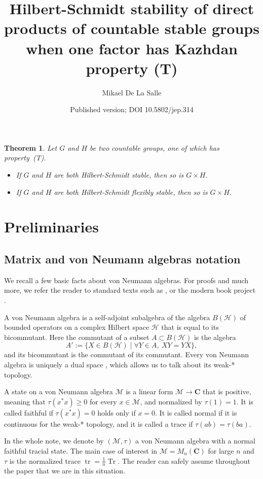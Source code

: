\documentclass[10pt]{amsart}
\title[HS stability of direct products]{Hilbert-Schmidt stability of direct products of countable stable groups when one factor has Kazhdan property (T)}
\author{Mikael De La Salle}
\date{Published version; DOI 10.5802/jep.314}
\theoremstyle{plain}
\newtheorem{theorem}{Theorem}[section]
\theoremstyle{definition}
\newcommand{\C}{\mathbf{C}}
\newcommand{\cM}{\mathcal{M}}
\newcommand{\cH}{\mathcal{H}}
\DeclareMathOperator{\tr}{tr}
\DeclareMathOperator{\Tr}{Tr}
\numberwithin{equation}{section}
\begin{document}
\maketitle
\setcounter{section}{0}\setcounter{theorem}{0}
\begin{theorem}\label{thm:stability_direct_product_simple} Let $G$ and $H$ be two countable groups, one of which has property~(T).\enlargethispage{.5\baselineskip}

\begin{itemize}
\item
If $G$ and $H$ are both Hilbert-Schmidt stable, then so is $G\times H$.

\item
If $G$ and $H$ are both Hilbert-Schmidt flexibly stable, then so is $G\times H$.
\end{itemize}
\end{theorem}
\setcounter{section}{0}
\section{Preliminaries}\label{sec:preliminaries}
\subsection{Matrix and von Neumann algebras notation}
We recall a few basic facts about von Neumann algebras. For proofs and much more, we refer the reader to standard texts such as \cite{MR1873025}, or the modern book project \cite{AnantharamanPopa}.

A von Neumann algebra is a self-adjoint subalgebra of the algebra $B(\cH)$ of bounded operators on a complex Hilbert space $\cH$ that is equal to its bicommutant. Here the commutant of a subset $A\subset B(\cH)$ is the algebra
\[
A':=\{X\in B(\cH)\mid \forall Y \in A,\ XY=YX\},
\] and its bicommutant is the commutant of its commutant. Every von Neumann algebra is uniquely a dual space \cite[Cor.\,III.3.9]{MR1873025}, which allows us to talk about its weak-* topology.

A state on a von Neumann algebra $\cM$ is a linear form $\cM \to \C$ that is positive, meaning that $\tau(x^*x)\geq 0$ for every $x\in \cM$, and normalized by $\tau(1)=1$. It is called faithful if $\tau(x^*x)=0$ holds only if $x=0$. It is called normal if it is continuous for the weak-* topology, and it is called a trace if $\tau(ab)=\tau(ba)$.

In the whole note, we denote by $(\cM,\tau)$ a von Neumann algebra with a normal faithful tracial state. The main case of interest in $\cM = M_n(\C)$ for large $n$ and $\tau$ is the normalized trace $\tr = \frac{1}{n}\Tr$. The reader can safely assume throughout the paper that we are in this situation.
\end{document}
